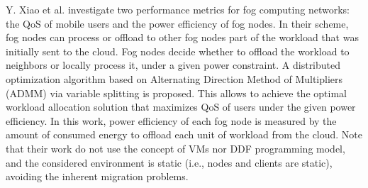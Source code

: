 \noindent\tab Y. Xiao et al. \cite{xiao2017qoe} investigate two performance metrics for fog computing networks: the QoS of mobile users and the power efficiency of fog nodes. In their scheme, fog nodes can process or offload to other fog nodes part of the workload that was initially sent to the cloud. Fog nodes decide whether to offload the workload to neighbors or locally process it, under a given power constraint. A distributed optimization algorithm based on Alternating Direction Method of Multipliers (ADMM) via variable splitting is proposed. This allows to achieve the optimal workload allocation solution that maximizes QoS of users under the given power efficiency. In this work, power efficiency of each fog node is measured by the amount of consumed energy to offload each unit of workload from the cloud. Note that their work do not use the concept of VMs nor DDF programming model, and the considered environment is static (i.e., nodes and clients are static), avoiding the inherent migration problems.
